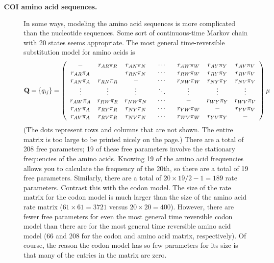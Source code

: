 \documentclass{svmult}
\begin{document}
\begin{description}
\item[ {\bf COI amino acid sequences.}] In some ways, modeling the amino acid sequences is more complicated than the nucleotide sequences. 
Some sort of continuous-time Markov chain with 20 states seems appropriate. The most general time-reversible substitution model for amino acids is
\begin{equation*}
{\mathbf Q} = \{q_{ij}\} = \left( \begin{array}{ccccccc}
-                       &  r_{AR} \pi_R  & r_{AN} \pi_N  & \hspace{0.1in} \cdots \hspace{0.1in} &  r_{AW} \pi_W &  r_{AY} \pi_Y &  r_{AV} \pi_V \\
r_{AR} \pi_A  &  -                       & r_{RN} \pi_N  & \cdots &  r_{RW} \pi_W &  r_{RY} \pi_Y &  r_{RV} \pi_V \\
r_{AN} \pi_A  &  r_{RN} \pi_R & -                        & \cdots &  r_{NW} \pi_W &  r_{NY} \pi_Y &  r_{NV} \pi_V \\
\vdots              & \vdots              & \vdots               & \ddots & \vdots               & \vdots             & \vdots              \\
r_{AW} \pi_A &  r_{RW} \pi_R & r_{NW} \pi_N & \cdots &  -                        &  r_{WY} \pi_Y &  r_{WV} \pi_V \\
r_{AY} \pi_A  &  r_{RY} \pi_R  & r_{NY} \pi_N  & \cdots &  r_{YW} \pi_W  &  -                      &  r_{YV} \pi_V \\
r_{AV} \pi_A  &  r_{RV} \pi_R  & r_{NV} \pi_N  & \cdots &  r_{WV} \pi_W  &  r_{YV} \pi_Y &  -                     \\
\end{array} \right) \mu
\end{equation*}
(The dots represent rows and columns that are not shown. The entire matrix is too large to be printed nicely on the page.) There are a total of 208 free parameters;
19 of these free parameters involve the stationary frequencies of the amino acids. Knowing 19 of the amino acid frequencies allows you to calculate the frequency
of the 20th, so there are a total of 19 free parameters. Similarly, there are a total of $20 \times 19 / 2 - 1 = 189$ rate parameters. 
Contrast this with the codon model. The size of the rate matrix for the codon model is much larger than the size of the amino acid rate matrix 
($61 \times 61 = 3721$ versus $20 \times 20 = 400$). However, there are fewer free parameters for even the most general time reversible codon model
than there are for the most general time reversible amino acid model (66 and 208 for the codon and amino acid matrix, respectively). Of course, the reason the codon
model has so few parameters for its size is that many of the entries in the matrix are zero.\\


\end{description}
\end{document}
